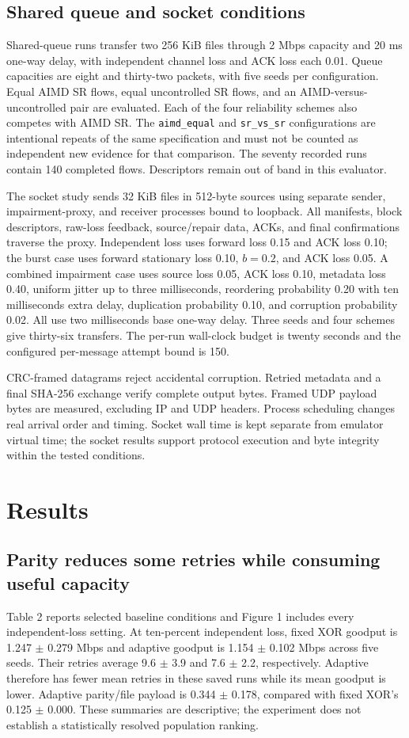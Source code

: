 \documentclass[11pt,a4paper]{article}
\begin{document}
\subsection{Shared queue and socket conditions}
Shared-queue runs transfer two 256 KiB files through 2 Mbps capacity and 20 ms one-way delay, with independent channel loss and ACK loss each 0.01. Queue capacities are eight and thirty-two packets, with five seeds per configuration. Equal AIMD SR flows, equal uncontrolled SR flows, and an AIMD-versus-uncontrolled pair are evaluated. Each of the four reliability schemes also competes with AIMD SR. The \texttt{aimd\_\allowbreak{}equal} and \texttt{sr\_\allowbreak{}vs\_\allowbreak{}sr} configurations are intentional repeats of the same specification and must not be counted as independent new evidence for that comparison. The seventy recorded runs contain 140 completed flows. Descriptors remain out of band in this evaluator.

The socket study sends 32 KiB files in 512-byte sources using separate sender, impairment-proxy, and receiver processes bound to loopback. All manifests, block descriptors, raw-loss feedback, source/repair data, ACKs, and final confirmations traverse the proxy. Independent loss uses forward loss 0.15 and ACK loss 0.10; the burst case uses forward stationary loss 0.10, $b=0.2$, and ACK loss 0.05. A combined impairment case uses source loss 0.05, ACK loss 0.10, metadata loss 0.40, uniform jitter up to three milliseconds, reordering probability 0.20 with ten milliseconds extra delay, duplication probability 0.10, and corruption probability 0.02. All use two milliseconds base one-way delay. Three seeds and four schemes give thirty-six transfers. The per-run wall-clock budget is twenty seconds and the configured per-message attempt bound is 150.

CRC-framed datagrams reject accidental corruption. Retried metadata and a final SHA-256 exchange verify complete output bytes. Framed UDP payload bytes are measured, excluding IP and UDP headers. Process scheduling changes real arrival order and timing. Socket wall time is kept separate from emulator virtual time; the socket results support protocol execution and byte integrity within the tested conditions.

\section{Results}
\subsection{Parity reduces some retries while consuming useful capacity}
Table 2 reports selected baseline conditions and Figure 1 includes every independent-loss setting. At ten-percent independent loss, fixed XOR goodput is 1.247 $\pm$ 0.279 Mbps and adaptive goodput is 1.154 $\pm$ 0.102 Mbps across five seeds. Their retries average 9.6 $\pm$ 3.9 and 7.6 $\pm$ 2.2, respectively. Adaptive therefore has fewer mean retries in these saved runs while its mean goodput is lower. Adaptive parity/file payload is 0.344 $\pm$ 0.178, compared with fixed XOR's 0.125 $\pm$ 0.000. These summaries are descriptive; the experiment does not establish a statistically resolved population ranking.
\end{document}
